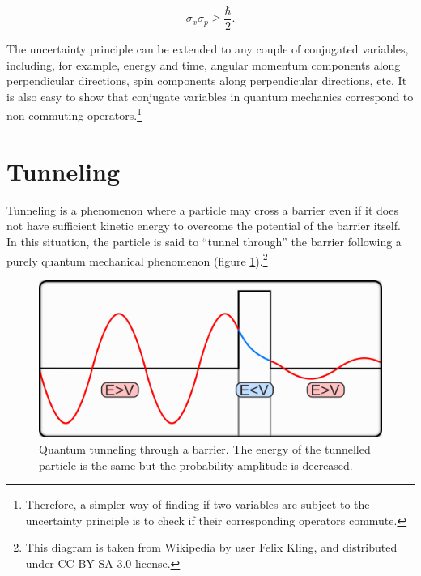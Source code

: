 \documentclass[
  9pt,
]{extbook}
\theoremstyle{definition}
\theoremstyle{definition}
\theoremstyle{definition}
\theoremstyle{remark}
\begin{document}
\begin{equation}
\sigma_{x}\sigma_{p} \geq \frac{\hbar }{2}.
\label{eq:heis3}  
\end{equation}

The uncertainty principle can be extended to any couple of conjugated variables, including, for example, energy and time, angular momentum components along perpendicular directions, spin components along perpendicular directions, etc. It is also easy to show that conjugate variables in quantum mechanics correspond to non-commuting operators.\footnote{Therefore, a simpler way of finding if two variables are subject to the uncertainty principle is to check if their corresponding operators commute.}

\hypertarget{tunneling}{%
\section{Tunneling}\label{tunneling}}

Tunneling is a phenomenon where a particle may cross a barrier even if it does not have sufficient kinetic energy to overcome the potential of the barrier itself. In this situation, the particle is said to ``tunnel through'' the barrier following a purely quantum mechanical phenomenon (figure \ref{fig:Fig3c9}).\footnote{This diagram is taken from \href{https://en.wikipedia.org/wiki/Quantum_tunnelling\#/media/File:TunnelEffektKling1.png}{Wikipedia} by user Felix Kling, and distributed under CC BY-SA 3.0 license.}

\begin{figure}

{\centering \includegraphics[width=0.7\linewidth]{./img/OEP_wiki9} 

}

\caption{Quantum tunneling through a barrier. The energy of the tunnelled particle is the same but the probability amplitude is decreased.}\label{fig:Fig3c9}
\end{figure}
\end{document}
